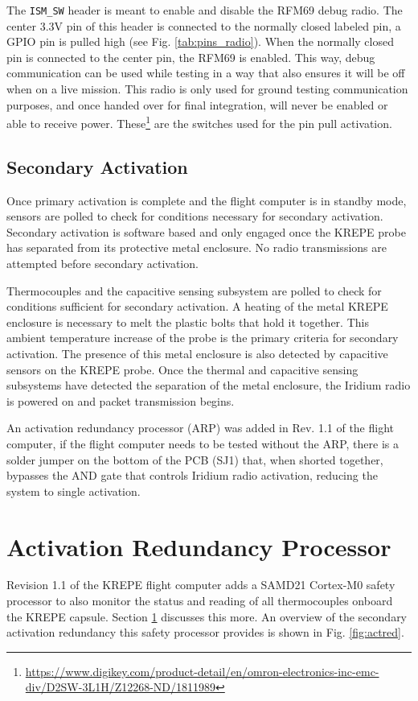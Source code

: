 \documentclass{article}
\begin{document}
The \texttt{ISM\_SW} header is meant to enable and disable the RFM69 debug radio. The center 3.3V pin of this header is connected to the normally closed labeled pin, a GPIO pin is pulled high (see Fig. \ref{tab:pins_radio}). When the normally closed pin is connected to the center pin, the RFM69 is enabled. This way, debug communication can be used while testing in a way that also ensures it will be off when on a live mission. This radio is only used for ground testing communication purposes, and once handed over for final integration, will never be enabled or able to receive power. These\footnote{\url{https://www.digikey.com/product-detail/en/omron-electronics-inc-emc-div/D2SW-3L1H/Z12268-ND/1811989}} are the switches used for the pin pull activation.




\subsection{Secondary Activation}
Once primary activation is complete and the flight computer is in standby mode, sensors are polled to check for conditions necessary for secondary activation. Secondary activation is software based and only engaged once the KREPE probe has separated from its protective metal enclosure. No radio transmissions are attempted before secondary activation. 

Thermocouples and the capacitive sensing subsystem are polled to check for conditions sufficient for secondary activation. A heating of the metal KREPE enclosure is necessary to melt the plastic bolts that hold it together. This ambient temperature increase of the probe is the primary criteria for secondary activation. The presence of this metal enclosure is also detected by capacitive sensors on the KREPE probe. Once the thermal and capacitive sensing subsystems have detected the separation of the metal enclosure, the Iridium radio is powered on and packet transmission begins.  

An activation redundancy processor (ARP) was added in Rev. 1.1 of the flight computer, if the flight computer needs to be tested without the ARP, there is a solder jumper on the bottom of the PCB (SJ1) that, when shorted together, bypasses the AND gate that controls Iridium radio activation, reducing the system to single activation.

\section{Activation Redundancy Processor}
\label{actred}
Revision 1.1 of the KREPE flight computer adds a SAMD21 Cortex-M0 safety processor to also monitor the status and reading of all thermocouples onboard the KREPE capsule. Section \ref{actred} discusses this more. An overview of the secondary activation redundancy this safety processor provides is shown in Fig. \ref{fig:actred}.
\end{document}
